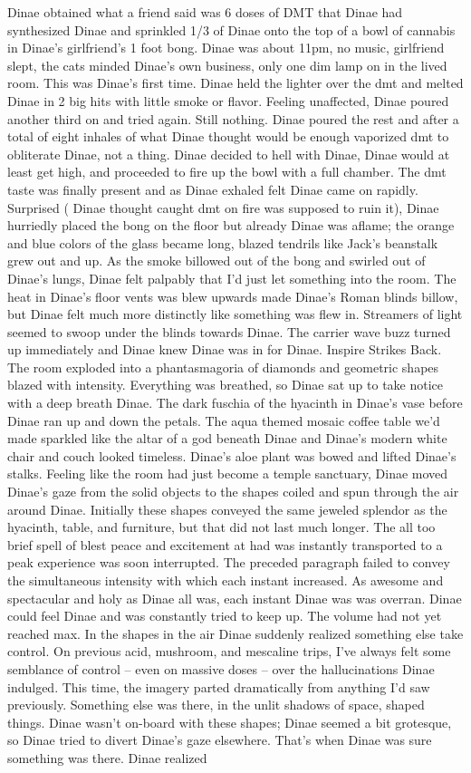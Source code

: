 \documentclass[12pt]{book}
\begin{document}
Dinae obtained what a friend said was 6 doses of DMT that Dinae had synthesized Dinae and sprinkled 1/3 of Dinae onto the top of a bowl of cannabis in Dinae's girlfriend's 1 foot bong. Dinae was about 11pm, no music, girlfriend slept, the cats minded Dinae's own business, only one dim lamp on in the lived room. This was Dinae's first time. Dinae held the lighter over the dmt and melted Dinae in 2 big hits with little smoke or flavor. Feeling unaffected, Dinae poured another third on and tried again. Still nothing. Dinae poured the rest and after a total of eight inhales of what Dinae thought would be enough vaporized dmt to obliterate Dinae, not a thing. Dinae decided to hell with Dinae, Dinae would at least get high, and proceeded to fire up the bowl with a full chamber. The dmt taste was finally present and as Dinae exhaled felt Dinae came on rapidly. Surprised ( Dinae thought caught dmt on fire was supposed to ruin it), Dinae hurriedly placed the bong on the floor but already Dinae was aflame; the orange and blue colors of the glass became long, blazed tendrils like Jack's beanstalk grew out and up. As the smoke billowed out of the bong and swirled out of Dinae's lungs, Dinae felt palpably that I'd just let something into the room. The heat in Dinae's floor vents was blew upwards made Dinae's Roman blinds billow, but Dinae felt much more distinctly like something was flew in. Streamers of light seemed to swoop under the blinds towards Dinae. The carrier wave buzz turned up immediately and Dinae knew Dinae was in for Dinae. Inspire Strikes Back. The room exploded into a phantasmagoria of diamonds and geometric shapes blazed with intensity. Everything was breathed, so Dinae sat up to take notice with a deep breath Dinae. The dark fuschia of the hyacinth in Dinae's vase before Dinae ran up and down the petals. The aqua themed mosaic coffee table we'd made sparkled like the altar of a god beneath Dinae and Dinae's modern white chair and couch looked timeless. Dinae's aloe plant was bowed and lifted Dinae's stalks. Feeling like the room had just become a temple sanctuary, Dinae moved Dinae's gaze from the solid objects to the shapes coiled and spun through the air around Dinae. Initially these shapes conveyed the same jeweled splendor as the hyacinth, table, and furniture, but that did not last much longer. The all too brief spell of blest peace and excitement at had was instantly transported to a peak experience was soon interrupted. The preceded paragraph failed to convey the simultaneous intensity with which each instant increased. As awesome and spectacular and holy as Dinae all was, each instant Dinae was was overran. Dinae could feel Dinae and was constantly tried to keep up. The volume had not yet reached max. In the shapes in the air Dinae suddenly realized something else take control. On previous acid, mushroom, and mescaline trips, I've always felt some semblance of control -- even on massive doses -- over the hallucinations Dinae indulged. This time, the imagery parted dramatically from anything I'd saw previously. Something else was there, in the unlit shadows of space, shaped things. Dinae wasn't on-board with these shapes; Dinae seemed a bit grotesque, so Dinae tried to divert Dinae's gaze elsewhere. That's when Dinae was sure something was there. Dinae realized 
\end{document}

